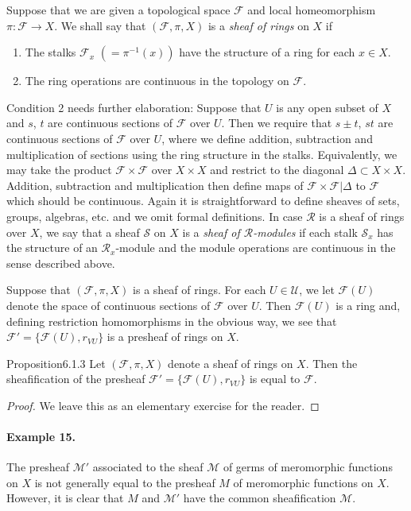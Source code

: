 Suppose that we are given a topological space $\mathcal F$ and local homeomorphism $\pi:\mathcal F\to X$. We shall say that $(\mathcal F,\pi,X)$ is a \emph{sheaf of rings} on $X$ if
\begin{enumerate}
\item The stalks $\mathcal F_x$ $(=\pi^{-1}(x))$ have the structure of a ring for each $x\in X$.
\item The ring operations are continuous in the topology on $\mathcal F$.
\end{enumerate}
Condition 2 needs further elaboration: Suppose that $U$ is any open subset of $X$ and $s$, $t$ are continuous sections of $\mathcal F$ over $U$. Then we require that $s\pm t$, $st$ are continuous sections of $\mathcal F$ over $U$, where we define addition, subtraction and multiplication of sections using the ring structure in the stalks. Equivalently, we may take the product $\mathcal F\times\mathcal F$ over $X\times X$ and restrict to the diagonal $\Delta\subset X\times X$. Addition, subtraction and multiplication then define maps of $\mathcal F\times\mathcal F|\Delta$ to $\mathcal F$ which should be continuous.
Again it is straightforward to define sheaves of sets, groups, algebras, etc. and we omit formal definitions. In case $\mathcal R$ is a sheaf of rings over $X$, we say that a sheaf $\mathcal S$ on $X$ is a \emph{sheaf of $\mathcal R$-modules} if each stalk $\mathcal S_x$ has the structure of an $\mathcal R_x$-module and the module operations are continuous in the sense described above.

Suppose that $(\mathcal F,\pi,X)$ is a sheaf of rings. For each $U\in\mathcal U$, we let $\mathcal F(U)$ denote the space of continuous sections of $\mathcal F$ over $U$. Then $\mathcal F(U)$ is a ring and, defining restriction homomorphisms in the obvious way, we see that $\mathcal F'=\{\mathcal F(U),r_{VU}\}$ is a presheaf of rings on $X$.

\begin{originaltheorem}{Proposition}{6.1.3}
Let $(\mathcal F,\pi,X)$ denote a sheaf of rings on $X$. Then the sheafification of the presheaf $\mathcal F'=\{\mathcal F(U),r_{VU}\}$ is equal to $\mathcal F$.
\end{originaltheorem}
\begin{proof}
We leave this as an elementary exercise for the reader.
\end{proof}
\paragraph{Example 15.}
The presheaf $\mathcal M'$ associated to the sheaf $\mathcal M$ of germs of meromorphic functions on $X$ is not generally equal to the presheaf $M$ of meromorphic functions on $X$. However, it is clear that $M$ and $\mathcal M'$ have the common sheafification $\mathcal M$.

